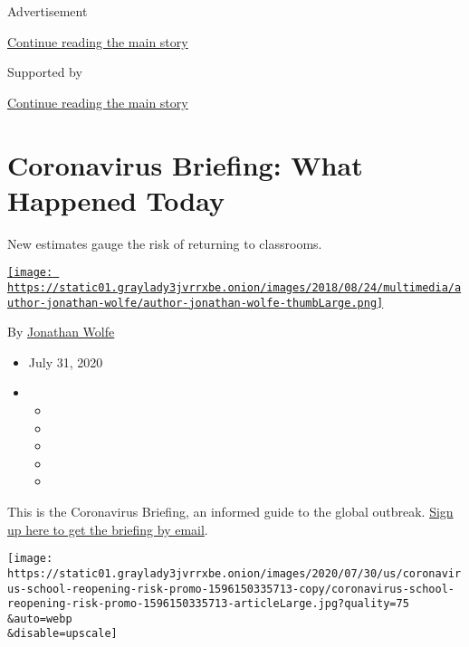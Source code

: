 Advertisement

\protect\hyperlink{after-top}{Continue reading the main story}

Supported by

\protect\hyperlink{after-sponsor}{Continue reading the main story}

\hypertarget{coronavirus-briefing-what-happened-today}{%
\section{Coronavirus Briefing: What Happened
Today}\label{coronavirus-briefing-what-happened-today}}

New estimates gauge the risk of returning to classrooms.

\href{https://www.nytimes3xbfgragh.onion/by/jonathan-wolfe}{\texttt{[image: https://static01.graylady3jvrrxbe.onion/images/2018/08/24/multimedia/author-jonathan-wolfe/author-jonathan-wolfe-thumbLarge.png]}}

By \href{https://www.nytimes3xbfgragh.onion/by/jonathan-wolfe}{Jonathan
Wolfe}

\begin{itemize}
\item
  July 31, 2020
\item
  \begin{itemize}
  \item
  \item
  \item
  \item
  \item
  \end{itemize}
\end{itemize}

This is the Coronavirus Briefing, an informed guide to the global
outbreak.
\href{https://www.nytimes3xbfgragh.onion/newsletters/coronavirus-briefing}{Sign
up here to get the briefing by email}.

\texttt{[image: https://static01.graylady3jvrrxbe.onion/images/2020/07/30/us/coronavirus-school-reopening-risk-promo-1596150335713-copy/coronavirus-school-reopening-risk-promo-1596150335713-articleLarge.jpg?quality=75\\\&auto=webp\\\&disable=upscale]}


